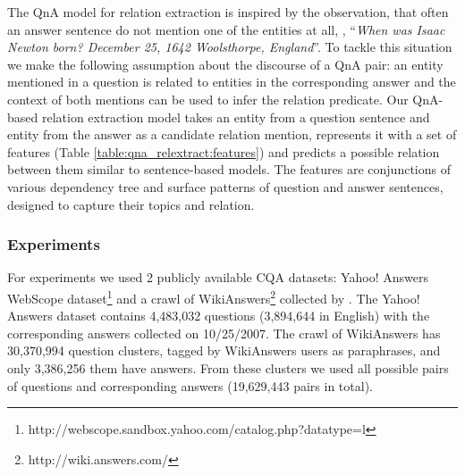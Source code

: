 The QnA model for relation extraction is inspired by the observation, that often an answer sentence do not mention one of the entities at all, \eg, ``\textit{When was Isaac Newton born? December 25, 1642 Woolsthorpe, England}''.
To tackle this situation we make the following assumption about the discourse of a QnA pair: an entity mentioned in a question is related to entities in the corresponding answer and the context of both mentions can be used to infer the relation predicate.
Our QnA-based relation extraction model takes an entity from a question sentence and entity from the answer as a candidate relation mention, represents it with a set of features (Table \ref{table:qna_relextract:features}) and predicts a possible relation between them similar to sentence-based models.
The features are conjunctions of various dependency tree and surface patterns of question and answer sentences, designed to capture their topics and relation.

\subsubsection{Experiments}
\label{section:factoid:approaches:cqarelextract:experiments}

For experiments we used 2 publicly available CQA datasets: Yahoo! Answers WebScope dataset\footnote{http://webscope.sandbox.yahoo.com/catalog.php?datatype=l} and a crawl of WikiAnswers\footnote{http://wiki.answers.com/} collected by \cite{Fader:2014:OQA:2623330.2623677}.
The Yahoo! Answers dataset contains 4,483,032 questions (3,894,644 in English) with the corresponding answers collected on 10/25/2007.
The crawl of WikiAnswers has 30,370,994 question clusters, tagged by WikiAnswers users as paraphrases, and only 3,386,256 them have answers.
From these clusters we used all possible pairs of questions and corresponding answers (19,629,443 pairs in total).

